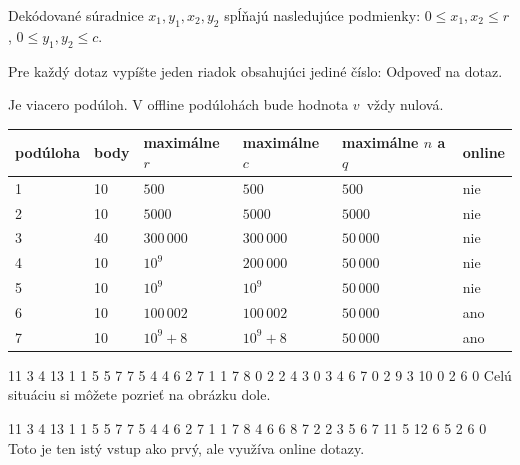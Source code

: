 Dekódované súradnice $x_1, y_1, x_2, y_2$ spĺňajú nasledujúce podmienky:
$0 \leq x_1, x_2 \leq r$, $0 \leq y_1, y_2 \leq c$. 


Pre každý dotaz vypíšte jeden riadok obsahujúci jediné číslo: Odpoveď na dotaz.


Je viacero podúloh. V offline podúlohách bude hodnota $v$ vždy nulová.

\bigskip

\begin{center}
\begin{tabular}{|l|l|l|l|l|l|}
\hline
podúloha& body   & maximálne $r$& maximálne $c$ & maximálne $n$ a $q$ & online    \\ \hline
1       & 10     & $500$        & $500$         & $500$     & nie        \\ \hline
2       & 10     & $5000$       & $5000$        & $5000$    & nie        \\ \hline
3       & 40     & $300\,000$   & $300\,000$    & $50\,000$ & nie        \\ \hline
4       & 10     & $10^9$       & $200\,000$    & $50\,000$ & nie        \\ \hline
5       & 10     & $10^9$       & $10^9$        & $50\,000$ & nie        \\ \hline
6       & 10     & $100\,002$   & $100\,002$    & $50\,000$ & ano       \\ \hline
7       & 10     & $10^9 + 8$   & $10^9 + 8$    & $50\,000$ & ano       \\ \hline
\end{tabular}
\end{center}



 11 3 4 13
1 1 5 5
7 7 5 4
4 6 2 7
1 1 7 8 0
2 2 4 3 0
3 4 6 7 0
2 9 3 10 0
2
6
0
\sampleCOMMENT
Celú situáciu si môžete pozrieť na obrázku dole.
\sampleEND
{}

 11 3 4 13
1 1 5 5
7 7 5 4
4 6 2 7
1 1 7 8 4
6 6 8 7 2
2 3 5 6 7
11 5 12 6 5
2
6
0
\sampleCOMMENT
Toto je ten istý vstup ako prvý, ale využíva online dotazy.
\sampleEND

